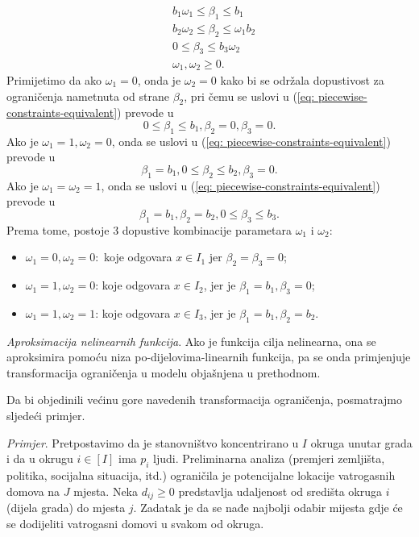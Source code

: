 \documentclass[a4paper, utf8, 11pt, colorlinks]{article}
\begin{document}
\begin{align}
     & b_1 \omega_1 \leq \beta_1 \leq b_1   \nonumber \\
     & b_2 \omega_2 \leq \beta_2 \leq \omega_1 b_2 \nonumber \\
     & 0 \leq \beta_3 \leq b_3 \omega_2 \nonumber \\
     & \omega_1, \omega_2 \geq 0. \label{eq: piecewise-constraints-equivalent}
\end{align}
      Primijetimo da ako $\omega_1 = 0$, onda je $\omega_2= 0$ kako bi se održala dopustivost za ograničenja nametnuta  od strane $\beta_2$, pri čemu se uslovi u (\ref{eq: piecewise-constraints-equivalent}) prevode u
      $$ 0 \leq \beta_1 \leq b_1, \beta_2 =0, \beta_3 =0.$$
      Ako je $\omega_1 = 1, \omega_2 = 0$, onda se uslovi u (\ref{eq: piecewise-constraints-equivalent}) prevode u
            $$   \beta_1 = b_1, 0 \leq \beta_2 \leq b_2, \beta_3 =0.$$
    Ako je $\omega_1 = \omega_2 = 1$, onda se  uslovi u (\ref{eq: piecewise-constraints-equivalent}) prevode u
    $$ \beta_1 = b_1, \beta_2 = b_2, 0 \leq \beta_3 \leq b_3.$$
    Prema tome, postoje 3 dopustive kombinacije parametara $\omega_1$ i $\omega_2$:
    \begin{itemize}
             \item  $\omega_1 = 0, \omega_2= 0:$ koje odgovara $x \in I_1$ jer $\beta_2=\beta_3=0$;  
             \item $\omega_1 = 1, \omega_2 = 0$: koje odgovara $x\in I_2$, jer je $\beta_1=b_1, \beta_3=0$;
              \item $\omega_1 = 1, \omega_2 = 1$: koje odgovara $x\in I_3$, jer je $\beta_1=b_1, \beta_2=b_2$.
    \end{itemize}
    
\emph{Aproksimacija nelinearnih funkcija}. Ako je funkcija cilja nelinearna, ona se aproksimira pomoću niza po-dijelovima-linearnih funkcija, pa se onda primjenjuje transformacija ograničenja u modelu objašnjena u prethodnom. 

Da bi objedinili većinu gore navedenih transformacija ograničenja, posmatrajmo sljedeći primjer. 


\emph{Primjer}. Pretpostavimo da je stanovništvo koncentrirano u $I$ okruga  unutar grada i da u okrugu $i\in [I]$ ima $p_i$ ljudi. Preliminarna analiza (premjeri zemljišta, politika, socijalna situacija, itd.) ograničila je potencijalne lokacije vatrogasnih domova na $J$ mjesta. Neka $d_{ij} \geq 0$ predstavlja udaljenost od središta okruga $i$ (dijela grada) do mjesta $j$. Zadatak je da se nađe najbolji odabir mijesta gdje će se dodijeliti vatrogasni domovi u svakom od okruga.  
\end{document}
